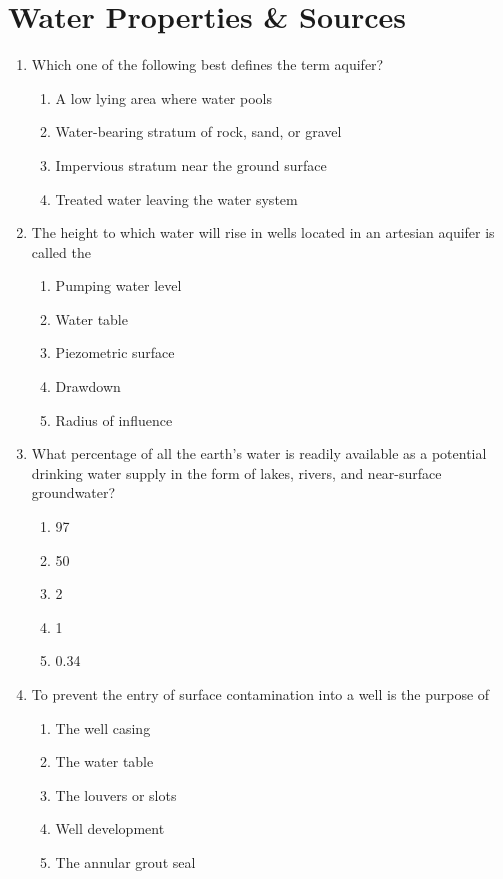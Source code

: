 \documentclass{article}
\begin{document}
 


\section{Water Properties \& Sources}
\begin{enumerate}
\item Which one of the following best defines the term aquifer?\\
\begin{enumerate}
\item A low lying area where water pools
\item Water-bearing stratum of rock, sand, or gravel
\item Impervious stratum near the ground surface
\item Treated water leaving the water system
\end{enumerate}

\item The height to which water will rise in wells located in an artesian aquifer is called the
\begin{enumerate}
\item Pumping water level
\item Water table
\item Piezometric surface
\item Drawdown
\item Radius of influence
\end{enumerate}

\item What percentage of all the earth's water is readily available as a potential drinking water supply in the form of lakes, rivers, and near-surface groundwater?
\begin{enumerate}
\item 97%
\item 50%
\item 2%
\item 1%
\item 0.34%
\end{enumerate}

\item To  prevent the entry of surface contamination into a well is the purpose of
\begin{enumerate}
\item The well casing
\item The water table
\item The louvers or slots
\item Well development
\item The  annular grout seal	
\end{enumerate}


\end{enumerate}
\end{document}
